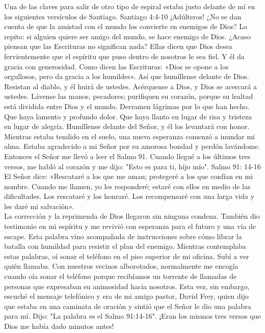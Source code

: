 \documentclass[twoside, 12pt]{book}
\begin{document}
Una de las claves para salir de otro tipo de espiral estaba justo delante de mí en los siguientes versículos de Santiago. Santiago 4:4-10 ¡Adúlteros! ¿No se dan cuenta de que la amistad con el mundo los convierte en enemigos de Dios? Lo repito: si alguien quiere ser amigo del mundo, se hace enemigo de Dios. ¿Acaso piensan que las Escrituras no significan nada? Ellas dicen que Dios desea fervientemente que el espíritu que puso dentro de nosotros le sea fiel. Y él da gracia con generosidad. Como dicen las Escrituras: «Dios se opone a los orgullosos, pero da gracia a los humildes». Así que humíllense delante de Dios. Resistan al diablo, y él huirá de ustedes. Acérquense a Dios, y Dios se acercará a ustedes. Lávense las manos, pecadores; purifiquen su corazón, porque su lealtad está dividida entre Dios y el mundo. Derramen lágrimas por lo que han hecho. Que haya lamento y profundo dolor. Que haya llanto en lugar de risa y tristeza en lugar de alegría. Humíllense delante del Señor, y él los levantará con honor.\\

Mientras estaba tendido en el suelo, una nueva esperanza comenzó a inundar mi alma. Estaba agradecido a mi Señor por su amorosa bondad y perdón lavándome. Entonces el Señor me llevó a leer el Salmo 91. Cuando llegué a los últimos tres versos, me habló al corazón y me dijo: "Esto es para ti, hijo mío". Salmo 91: 14-16 El Señor dice: «Rescataré a los que me aman; protegeré a los que confían en mi nombre. Cuando me llamen, yo les responderé; estaré con ellos en medio de las dificultades. Los rescataré y los honraré. Los recompensaré con una larga vida y les daré mi salvación».\\

La corrección y la reprimenda de Dios llegaron sin ninguna condena. También dio testimonio en mi espíritu y me revivió con esperanza para el futuro y una vía de escape. Esta palabra vino acompañada de instrucciones sobre cómo librar la batalla con humildad para resistir el plan del enemigo. Mientras contemplaba estas palabras, oí sonar el teléfono en el piso superior de mi oficina. Subí a ver quién llamaba. Con nuestros vecinos alborotados, normalmente me encogía cuando oía sonar el teléfono porque recibíamos un torrente de llamadas de personas que expresaban su animosidad hacia nosotros. Esta vez, sin embargo, escuché el mensaje telefónico y era de mi amigo pastor, David Frey, quien dijo que estaba en una caminata de oración y sintió que el Señor le dio una palabra para mí. Dijo: "La palabra es el Salmo 91:14-16". ¡Eran los mismos tres versos que Dios me había dado minutos antes!\\
\end{document}
